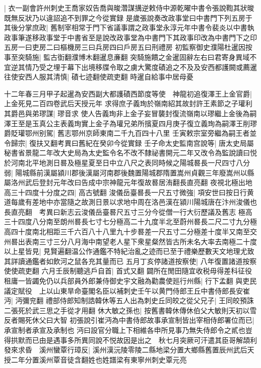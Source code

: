 |{
	衣一副會許州刺史王喬家奴告喬與晙濳謀搆逆敕侍中源乾曜中書令張說鞫其狀晙既無反狀乃以違詔追不到罪之今從實録}
是歲張說奏改政事堂曰中書門下列五房于其後分掌庶政|{
	舊制宰相常于門下省議事謂之政事堂永淳元年中書令裴炎以中書執政事筆遂移政事堂于中書省至是說改政事堂為中書門下其政事印改為中書門下之印五房一曰吏房二曰樞機房三曰兵房四曰戶房五曰刑禮房}
初監察御史濮陽杜暹因按事至突騎施|{
	監古衘翻濮博木翻暹息亷翻}
突騎施饋之金暹固辭左右曰君寄身異域不宜逆其情乃受之埋于幕下出境移牒令取之虜大驚度磧追之不及及安西都護闕或薦暹往使安西人服其清慎|{
	磧七迹翻使疏吏翻}
時暹自給事中居母憂

十二年春三月甲子起暹為安西副大都護磧西節度等使　神龍初追復澤王上金官爵|{
	上金死見二百四卷武后天授元年}
求得庶子義珣於嶺南紹其故封許王素節之子瓘利其爵邑與弟璆謀|{
	璆音求}
使人告義珣非上金子妄冒襲封復流嶺南以璆繼上金後為嗣澤王至是玉真公主表義珣實上金子為瓘兄弟所擯夏四月庚子復立義珣為嗣澤王削璆爵貶瓘鄂州别駕|{
	舊志鄂州京師東南二千九百四十八里}
壬寅敕宗室旁繼為嗣王者並令歸宗|{
	復扶又翻考異曰舊紀在癸卯今從實録}
壬子命太史監南宫說等|{
	唐太史局屬秘書省景龍二年改大史局為太史監令名不改不隸祕書開元二年又改令為監說讀曰悦}
於河南北平地測日晷及極星夏至日中立八尺之表同時候之陽城晷長一尺四寸八分弱|{
	陽城縣前漢屬潁川郡後漢屬河南郡後魏置陽城郡隋置嵩州貞觀三年廢嵩州以縣屬洛州武后登封元年改曰告成中宗神龍元年復故晷居洧翻長直亮翻}
夜視北極出地高三十四度十分度之四|{
	高古號翻}
浚儀岳臺晷長一尺五寸微強|{
	項安世曰按日行黄道每歲有差地中亦當隨之故測日景以求地中周在洛邑漢在潁川陽城唐在汴州浚儀也長直亮翻　考異曰新志云浚儀岳臺晷尺五寸三分今從僧一行大衍歷議及舊志}
極高三十四度八分南至朗州晷長七寸七分極高二十九度半北至蔚州晷長二尺二寸九分極高四十度南北相距三千六百八十八里九十步晷差一尺五寸二分極差十度半又南至交州晷出表南三寸三分八月海中南望老人星下衆星粲然皆古所未名大率去南極二十度以上星皆見|{
	見賢遍翻温公作通鑑不特紀治亂之迹而已至于禮樂歷數天文地理尤致其詳讀通鑑者如飲河之鼠各充其量而已}
五月丁亥停諸道按察使|{
	八年復置諸道按察使使疏吏翻}
六月壬辰制聽逃戶自首|{
	首式又翻}
闢所在閒田隨宜收税毋得差科征役租庸一皆蠲免仍以兵部員外郎兼侍御史宇文融為勸農使廵行州縣|{
	行下孟翻}
與吏民議定賦役　上以山東旱命臺閣名臣以補刺史壬午以黄門侍郎王丘中書侍郎長安崔沔|{
	沔彌兖翻}
禮部侍郎知制誥韓休等五人出為刺史丘同皎之從父兄子|{
	王同皎預誅二張死於武三思之手從才用翻}
休大敏之孫也|{
	按舊書韓休傳休伯父大敏則天初以雪反者賜死休父曰大智}
初張說引崔沔為中書侍郎故事承宣制皆出宰相侍郎署位而已|{
	承宣制者承宣及承制也}
沔曰設官分職上下相維各申所見事乃無失侍郎令之貳也豈得拱默而已由是遇事多所異同說不悦故因是出之　秋七月突厥可汗遣其臣哥解頡利發來求昏　溪州蠻覃行璋反|{
	溪州漢沅陵零陵二縣地梁分置大鄉縣舊置辰州武后天授二年分置溪州覃音徒含翻姓也姓譜梁有東寧州刺史覃元亮}
